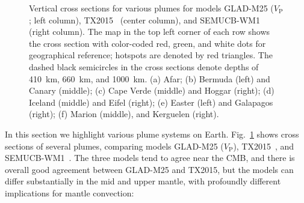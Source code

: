 \documentclass[extra,mreferee]{gji}
\begin{document}
\begin{figure}[ht!]
    \caption{\small{Vertical cross sections for various plumes for models GLAD-M25 ($V_\textrm{P}$; left column), TX2015~\citep[$V_\textrm{S}$;][]{TX2015} (center column), and SEMUCB-WM1~\citep[$V_\textrm{S}$;][]{french2015broad} (right column).
    The map in the top left corner of each row shows the cross section with color-coded red, green, and white dots for geographical reference;
    hotspots are denoted by red triangles.
    The dashed black semicircles in the cross sections denote depths of 410~km, 660~km, and 1000~km.
    (a) Afar; (b) Bermuda (left) and Canary (middle); (c) Cape Verde (middle) and Hoggar (right); (d) Iceland (middle) and Eifel (right); (e) Easter (left) and Galapagos (right); (f) Marion (middle), and Kerguelen (right). }}
    \label{fig:plumes}
\end{figure}

In this section we highlight various plume systems on Earth. Fig.~\ref{fig:plumes}
shows cross sections of several plumes, comparing models GLAD-M25 ($V_\textrm{P}$),
TX2015~\citep[$V_\textrm{S}$;][]{TX2015}, and SEMUCB-WM1~\citep[$V_\textrm{S}$;][]{french2015broad}.
The three models tend to agree near the CMB,
and there is overall good agreement between GLAD-M25 and TX2015,
but the models can differ substantially in the mid and upper mantle,
with profoundly different implications for mantle
convection:
\end{document}
